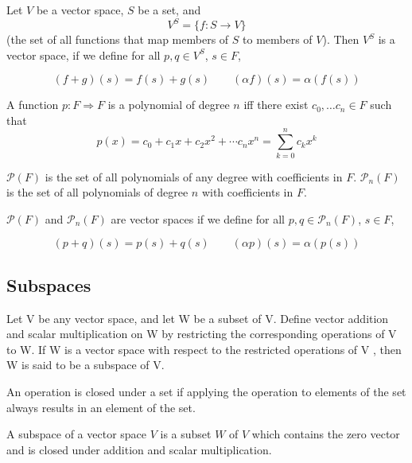 \begin{definition}
  Let $V$ be a vector space, $S$ be a set, and
  \[
    V^S = \{ f : S \rightarrow V \}
  \]
  (the set of all functions that map members of $S$ to members of $V$). Then $V^S$ is a vector space, if we define for all $p, q \in V^S$, $s \in F$,

  \[
    (f + g)(s) = f(s) + g(s) \qquad (\alpha f)(s) = \alpha (f(s))
  \]
\end{definition}

\begin{definition}[Polynomial]
  A function $p : F \Rightarrow F$ is a polynomial of degree $n$ iff there exist $c_0, \ldots c_n \in F$ such that
  \[
    p(x) = c_0 + c_1 x + c_2 x^2 + \cdots c_n x^n = \sum_{k=0}^n c_k x^k
  \]

  $\mathcal{P}(F)$ is the set of all polynomials of any degree with coefficients in $F$. $\mathcal{P}_n(F)$ is the set of all polynomials of degree $n$ with coefficients in $F$.

  $\mathcal{P}(F)$ and $\mathcal{P}_n(F)$ are vector spaces if we define for all $p, q \in \mathcal{P}_n(F)$, $s \in F$,

  \[
    (p + q)(s) = p(s) + q(s) \qquad (\alpha p)(s) = \alpha (p(s))
  \]
\end{definition}

\subsection{Subspaces}

\begin{definition}[Subspace]
  Let V be any vector space, and let W be a subset of V. Define vector addition and scalar multiplication on W by restricting the corresponding operations of V to W. If W is a vector space with respect to the restricted operations of V , then W is said to be a subspace of V.
\end{definition}

\begin{definition}[Closed]
  An operation is closed under a set if applying the operation to elements of the set always results in an element of the set.
\end{definition}

\begin{definition}[Subspace]
  A subspace of a vector space $V$ is a subset $W$ of $V$ which contains the zero vector and is closed under addition and scalar multiplication.
\end{definition}

